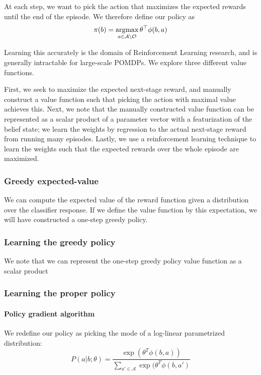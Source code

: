 \documentclass[runningheads]{llncs}
\begin{document}
At each step, we want to pick the action that maximizes the expected rewards until the end of the episode.
We therefore define our policy as
\begin{equation}
\pi(b) = \argmax_{a \in \mathcal{A} \setminus \mathcal{O}} \theta^\top \phi(b,a)
\end{equation}

Learning this accurately is the domain of Reinforcement Learning research, and is generally intractable for large-scale POMDPs.
We explore three different value functions.

First, we seek to maximize the expected next-stage reward, and manually construct a value function such that picking the action with maximal value achieves this.
Next, we note that the manually constructed value function can be represented as a scalar product of a parameter vector with a featurization of the belief state; we learn the weights by regression to the actual next-stage reward from running many episodes.
Lastly, we use a reinforcement learning technique to learn the weights such that the expected rewards over the whole episode are maximized.

\subsubsection{Greedy expected-value}
We can compute the expected value of the reward function given a distribution over the classifier response.
If we define the value function by this expectation, we will have constructed a one-step greedy policy.


\subsubsection{Learning the greedy policy}
We note that we can represent the one-step greedy policy value function as a scalar product 

\subsubsection{Learning the proper policy}

\paragraph{Policy gradient algorithm}
We redefine our policy as picking the mode of a log-linear parametrized distribution:
\begin{equation}
P(a|b;\theta) = \frac{\exp(\theta^T \phi(b,a))}{\sum_{a' \in \mathcal{A}} \exp(\theta^T \phi(b,a')}
\end{equation}
\end{document}
